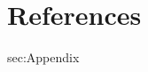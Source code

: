 

\section{References}
\begingroup
\renewcommand{\section}[2]{}%

\endgroup

\section{Appendix}
\label{sec:Appendix}

\section{Glossary and Acronyms}
\glsaddall
\renewcommand{\glossarysection}[2][]{}
\printglossary


